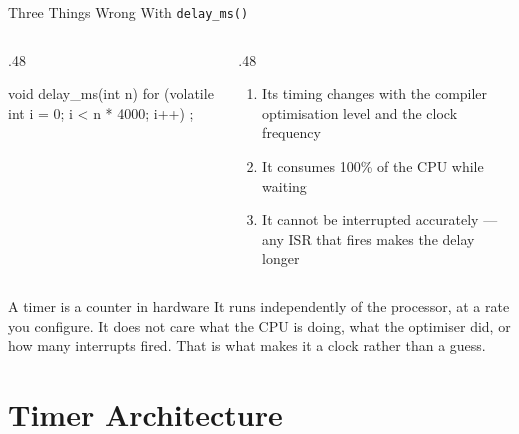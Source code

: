 \documentclass[9pt,aspectratio=169,xcolor=table]{beamer}
\begin{document}
\begin{frame}[fragile]{Three Things Wrong With \texttt{delay\_ms()}}
    \begin{columns}[T]
    \begin{column}{.48\textwidth}
\begin{cc}
	void delay_ms(int n) {
		for (volatile int i = 0;
		i < n * 4000; i++) ;
	}
\end{cc}
    \end{column}
    \begin{column}{.48\textwidth}
        \begin{enumerate}
            \item Its timing changes with the \alert{compiler optimisation
                  level} and the \alert{clock frequency}
            \item It consumes \alert{100\%} of the CPU while waiting
            \item It cannot be \alert{interrupted accurately} --- any ISR that
                  fires makes the delay longer
        \end{enumerate}
    \end{column}
    \end{columns}

    \vspace{3mm}
    \begin{block}{A timer is a counter in hardware}
        It runs independently of the processor, at a rate you configure. It does
        not care what the CPU is doing, what the optimiser did, or how many
        interrupts fired. \alert{That is what makes it a clock rather than a
        guess.}
    \end{block}
\end{frame}


\section{Timer Architecture}
\end{document}
